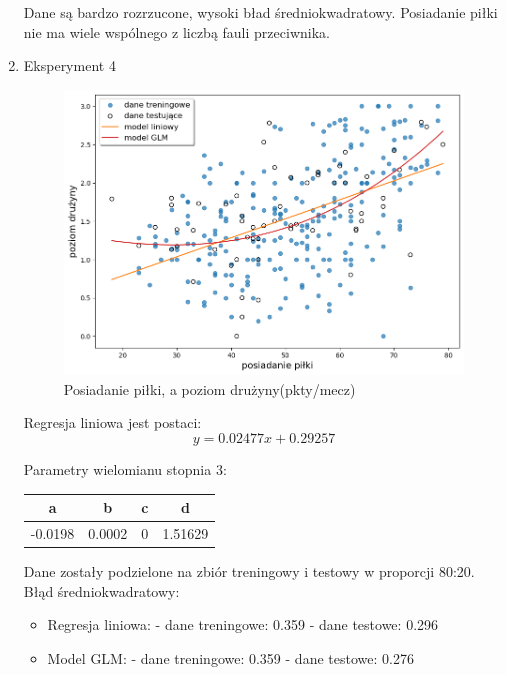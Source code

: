 \documentclass[11pt]{article}
\begin{document}
\begin{enumerate}[label=\alph*)]
    Dane są bardzo rozrzucone, wysoki bład średniokwadratowy. Posiadanie piłki nie ma wiele wspólnego z liczbą fauli przeciwnika.
    
    \item Eksperyment 4 \newline

    \begin{figure}[hbt]
    \includegraphics[scale=0.30]{level.png}
    \caption{Posiadanie piłki, a poziom drużyny(pkty/mecz)}
    \end{figure}

    Regresja liniowa jest postaci:
    \begin{equation}
    y = 0.02477x + 0.29257
    \end{equation}
    
      Parametry wielomianu stopnia 3:
    \begin{center}
    \begin{tabular}{| c | c | c | c |}
    \hline
    a & b & c & d \\ \hline
    -0.0198 & 0.0002 & 0 & 1.51629 \\ \hline
    \end{tabular}
    \end{center}

    Dane zostały podzielone na zbiór treningowy i testowy w proporcji 80:20.
    \newline
    \newline
    \newpage
     Błąd średniokwadratowy:
    \begin{itemize}
    \item Regresja liniowa: \newline
    - dane treningowe: 0.359 \newline
    - dane testowe: 0.296
    \item Model GLM: \newline
    - dane treningowe: 0.359 \newline
    - dane testowe: 0.276
    \end{itemize}


\end{enumerate}
\end{document}
